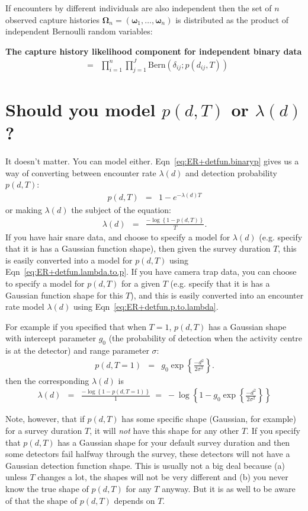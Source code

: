 \documentclass[graybox,envcountchap,sectrefs]{SpringerStyleFiles/styles/svmono}\usepackage[]{graphicx}\usepackage[]{color}
\newcommand{\be}{\begin{eqnarray}}
\newcommand{\ee}{\end{eqnarray}}
\begin{document}
If encounters by different individuals are also independent then the set of $n$ observed capture histories $\bm{\Omega}_n=(\bm{\omega}_1,\ldots,\bm{\omega}_n)$ is  distributed as the product of independent Bernoulli random variables:
\begin{svgraybox}
\bf{The capture history likelihood component for independent binary data}
\be
[\bm{\Omega}_n|\bm{S}_n]&=&\prod_{i=1}^n\prod_{j=1}^J\mbox{Bern}\left(\delta_{ij};p(d_{ij},T)\right)
\label{eq:ER+detfun.P.Omega.binary}
\ee
\end{svgraybox}

\section{Should you model $p(d,T)$ or $\lambda(d)$?}

It doesn't matter. You can model either. Eqn~\eqref{eq:ER+detfun.binaryp} gives us a way of converting between encounter rate $\lambda(d)$ and detection probability $p(d,T)$:
\be
p(d,T)&=&1-e^{-\lambda(d)T} 
\label{eq:ER+detfun.lambda.to.p}
\ee
\noindent
or making $\lambda(d)$ the subject of the equation:
\be
\lambda(d)&=&\frac{-\log\left\{1-p(d,T)\right\}}{T}.
\label{eq:ER+detfun.p.to.lambda}
\ee
If you have hair snare data, and choose to specify a model for $\lambda(d)$ (e.g. specify that it is has a Gaussian function shape), then given the survey duration $T$, this is easily converted into a model for $p(d,T)$ using Eqn~\eqref{eq:ER+detfun.lambda.to.p}. If you have camera trap data, you can choose to specify a model for $p(d,T)$ for a given $T$ (e.g. specify that it is has a Gaussian function shape for this $T$), and this is easily converted into an encounter rate model $\lambda(d)$ using Eqn~\eqref{eq:ER+detfun.p.to.lambda}.

For example if you specified that when $T=1$, $p(d,T)$ has a Gaussian shape with intercept parameter $g_0$ (the probability of detection when the activity centre is at the detector) and range parameter $\sigma$:
\be
p(d,T=1)&=&g_0\exp\left\{\frac{-d^2}{2\sigma^2}\right\}.
\label{eq:ER+detfun.p.hn}
\ee
\noindent
then the corresponding $\lambda(d)$ is
\be
\lambda(d)&=&\frac{-\log\left\{1-p(d,T=1)\right\}}{1}
\;=\;-\log\left\{1-g_0\exp\left\{\frac{-d^2}{2\sigma^2}\right\}\right\}
\label{eq:ER+detfun.Guassian.p.to.lambda}
\ee

Note, however, that if $p(d,T)$ has some specific shape (Gaussian, for example) for a survey duration $T$, it will \textit{not} have this shape for any other $T$. If you specify that $p(d,T)$ has a Gaussian shape for your default survey duration and then some detectors fail halfway through the survey, these detectors will not have a Gaussian detection function shape. This is usually not a big deal because (a) unless $T$ changes a lot, the shapes will not be very different and (b) you never know the true shape of $p(d,T)$ for any $T$ anyway. But it is as well to be aware of that the shape of $p(d,T)$ depends on $T$.
\end{document}
